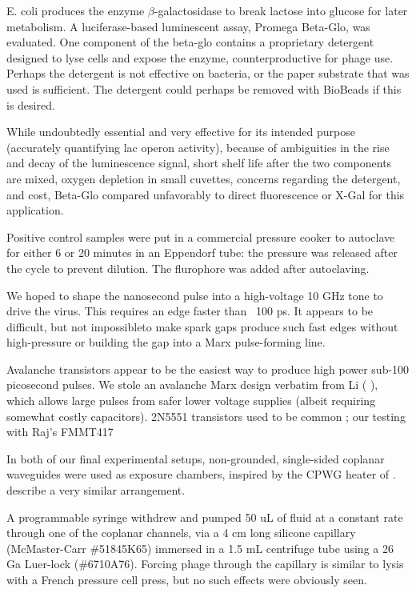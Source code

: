 \documentclass[paper.tex]{subfiles}
\begin{document}
\begin{multicols}{1}
E. coli produces the enzyme $\beta$-galactosidase to break lactose into glucose for later metabolism. A luciferase-based luminescent assay, Promega Beta-Glo, was evaluated. One component of the beta-glo contains a proprietary detergent designed to lyse cells\cite{BETAGLO2003} and expose the enzyme, counterproductive for phage use. Perhaps the detergent is not effective on bacteria, or the paper substrate that w\cite{rapid2014}as used is sufficient. The detergent could perhaps be removed with BioBeads if this is desired.
 
While undoubtedly essential and very effective for its intended purpose (accurately quantifying lac operon activity), because of ambiguities in the rise and decay of the luminescence signal, short shelf life after the two components are mixed, oxygen depletion in small cuvettes, concerns regarding the detergent, and cost, Beta-Glo compared unfavorably to direct fluorescence or X-Gal for this application.

Positive control samples were put in a commercial pressure cooker to autoclave for either 6 or 20 minutes in an Eppendorf tube: the pressure was released after the cycle to prevent dilution. The flurophore was added after autoclaving.

We hoped to shape the nanosecond pulse into a high-voltage 10 GHz tone to drive the virus. This requires an edge faster than ~100 ps. It appears to be difficult, but not impossible\cite{Fundamental1998}to make spark gaps produce such fast edges without high-pressure\cite{kHz1995} \cite{Design2007d}\cite{Picosecond1993} or building the gap into a Marx\cite{Simple1991} pulse-forming line. 

Avalanche transistors appear to be the easiest way to produce high power sub-100 picosecond pulses. We stole an avalanche Marx design verbatim from Li (\cite{Development2016b} \cite{Design2018c}), which allows large pulses from safer lower voltage supplies (albeit requiring somewhat costly capacitors). 2N5551 transistors used to be common \cite{Avalanche1991}\cite{high1994}\cite{High1998}; our testing with Raj's FMMT417

In both of our final experimental setups, non-grounded, single-sided coplanar waveguides were used as exposure chambers, inspired by the CPWG heater of \cite{Microwave2007}. \cite{Nanosecond2006} describe a very similar arrangement. 

A programmable syringe withdrew and pumped 50 uL of fluid at a constant rate through one of the coplanar channels, via a 4 cm long silicone capillary (McMaster-Carr \#51845K65) immersed in a 1.5 mL centrifuge tube using a 26 Ga Luer-lock (\#6710A76). Forcing phage through the capillary is similar to lysis with a French pressure cell press, but no such effects were obviously seen.


\end{multicols}
\end{document}

